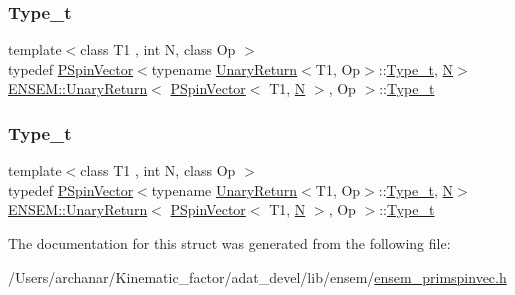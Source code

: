 \subsubsection{\texorpdfstring{Type\_t}{Type\_t}\hspace{0.1cm}{\footnotesize\ttfamily [1/2]}}
{\footnotesize\ttfamily template$<$class T1 , int N, class Op $>$ \\
typedef \mbox{\hyperlink{classENSEM_1_1PSpinVector}{P\+Spin\+Vector}}$<$typename \mbox{\hyperlink{structENSEM_1_1UnaryReturn}{Unary\+Return}}$<$T1, Op$>$\+::\mbox{\hyperlink{structENSEM_1_1UnaryReturn_3_01PSpinVector_3_01T1_00_01N_01_4_00_01Op_01_4_aa89ab5c0224d9343b5849e81a52271d4}{Type\+\_\+t}}, \mbox{\hyperlink{operator__name__util_8cc_a7722c8ecbb62d99aee7ce68b1752f337}{N}}$>$ \mbox{\hyperlink{structENSEM_1_1UnaryReturn}{E\+N\+S\+E\+M\+::\+Unary\+Return}}$<$ \mbox{\hyperlink{classENSEM_1_1PSpinVector}{P\+Spin\+Vector}}$<$ T1, \mbox{\hyperlink{operator__name__util_8cc_a7722c8ecbb62d99aee7ce68b1752f337}{N}} $>$, Op $>$\+::\mbox{\hyperlink{structENSEM_1_1UnaryReturn_3_01PSpinVector_3_01T1_00_01N_01_4_00_01Op_01_4_aa89ab5c0224d9343b5849e81a52271d4}{Type\+\_\+t}}}

\mbox{\label{structENSEM_1_1UnaryReturn_3_01PSpinVector_3_01T1_00_01N_01_4_00_01Op_01_4_aa89ab5c0224d9343b5849e81a52271d4}} 
\subsubsection{\texorpdfstring{Type\_t}{Type\_t}\hspace{0.1cm}{\footnotesize\ttfamily [2/2]}}
{\footnotesize\ttfamily template$<$class T1 , int N, class Op $>$ \\
typedef \mbox{\hyperlink{classENSEM_1_1PSpinVector}{P\+Spin\+Vector}}$<$typename \mbox{\hyperlink{structENSEM_1_1UnaryReturn}{Unary\+Return}}$<$T1, Op$>$\+::\mbox{\hyperlink{structENSEM_1_1UnaryReturn_3_01PSpinVector_3_01T1_00_01N_01_4_00_01Op_01_4_aa89ab5c0224d9343b5849e81a52271d4}{Type\+\_\+t}}, \mbox{\hyperlink{operator__name__util_8cc_a7722c8ecbb62d99aee7ce68b1752f337}{N}}$>$ \mbox{\hyperlink{structENSEM_1_1UnaryReturn}{E\+N\+S\+E\+M\+::\+Unary\+Return}}$<$ \mbox{\hyperlink{classENSEM_1_1PSpinVector}{P\+Spin\+Vector}}$<$ T1, \mbox{\hyperlink{operator__name__util_8cc_a7722c8ecbb62d99aee7ce68b1752f337}{N}} $>$, Op $>$\+::\mbox{\hyperlink{structENSEM_1_1UnaryReturn_3_01PSpinVector_3_01T1_00_01N_01_4_00_01Op_01_4_aa89ab5c0224d9343b5849e81a52271d4}{Type\+\_\+t}}}



The documentation for this struct was generated from the following file\+:\begin{DoxyCompactItemize}
\item 
/\+Users/archanar/\+Kinematic\+\_\+factor/adat\+\_\+devel/lib/ensem/\mbox{\hyperlink{lib_2ensem_2ensem__primspinvec_8h}{ensem\+\_\+primspinvec.\+h}}\end{DoxyCompactItemize}
